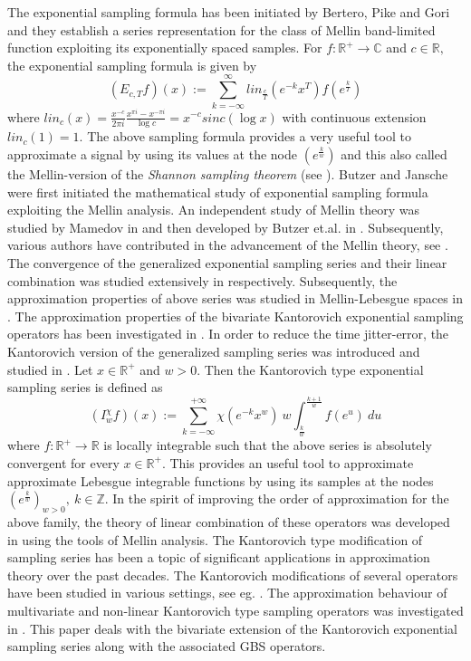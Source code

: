 \documentclass[12pt]{article}
\begin{document}
{The exponential sampling formula has been initiated by Bertero, Pike \cite{bertero} and Gori \cite{gori} and they establish a series representation for the class of Mellin band-limited function exploiting its exponentially spaced samples.
For $f:\mathbb{R}^+ \rightarrow \mathbb{C}$ and $c \in \mathbb{R},$ the exponential sampling formula is given by
$$ (E_{c,T}f)(x):= \sum_{k=-\infty}^{\infty} lin_{\frac{c}{T}}(e^{-k}x^{T}) f(e^{\frac{k}{T}})$$
where $lin_{c}(x)= \frac{x^{-c}}{2\pi i} \frac{x^{\pi i}-x^{-\pi i}}{\log c} = x^{-c} sinc(\log x)$ with continuous extension $lin_{c}(1)=1.$ The above sampling formula provides a very useful tool to approximate a signal by using its values at the node $ (e^{\frac{k}{w}})$ and this also called the Mellin-version of the \textit{Shannon sampling theorem} (see \cite{butzer2}).
Butzer and Jansche \cite{butzer5} were first initiated the mathematical study of exponential sampling formula exploiting the Mellin analysis. An independent study of Mellin theory was studied by Mamedov in \cite{mamedeo} and then developed by Butzer et.al. in \cite{butzer3,butzer4,butzer5,butzer7}. Subsequently, various authors have contributed in the advancement of the Mellin theory, see \cite{bardaro1,bardaro9,bardaro2,bardaro3}. The convergence of the generalized exponential sampling series and their linear combination was studied extensively in \cite{bardaro7,comboexp} respectively. Subsequently, the approximation properties of above series was studied in Mellin-Lebesgue spaces in \cite{bardaro11}. The approximation properties of the bivariate Kantorovich exponential sampling operators has been investigated in \cite{bvexp}. In order to reduce the time jitter-error, the Kantorovich version of the generalized sampling series was introduced and studied in \cite{own}. Let $ x \in \mathbb{R}^{+}$ and $ w >0.$ Then the Kantorovich type exponential sampling series is defined as
\begin{equation*}
(I_{w}^{\chi}f)(x):= \sum_{k= - \infty}^{+\infty} \chi(e^{-k} x^{w})\  w \int_{\frac{k}{w}}^{\frac{k+1}{w}} f(e^{u})\  du
\end{equation*}
where $ f: \mathbb{R}^{+} \rightarrow \mathbb{R}$ is locally integrable such that the above series is absolutely convergent for every $ x \in \mathbb{R}^{+}.$ This provides an useful tool to approximate approximate Lebesgue integrable functions by using its samples at the nodes $ (e^{\frac{k}{w}})_{w>0},\ k \in \mathbb{Z}.$ In the spirit of improving the order of approximation for the above family, the theory of linear combination of these operators was developed in \cite{lc} using the tools of Mellin analysis. The Kantorovich type modification of sampling series has been a topic of significant applications in approximation theory over the past decades. The Kantorovich modifications of several operators have been studied in various settings, see eg. \cite{bardaro10,bardaro6,costa2,costa3,vinti1,Dani,gupta2,deva}. The approximation behaviour of multivariate and non-linear Kantorovich type sampling operators was investigated in \cite{bv1,butz1,butz2,COS,Dan}. This paper deals with the bivariate extension of the Kantorovich exponential sampling series along with the associated GBS operators.\\
}
\end{document}
